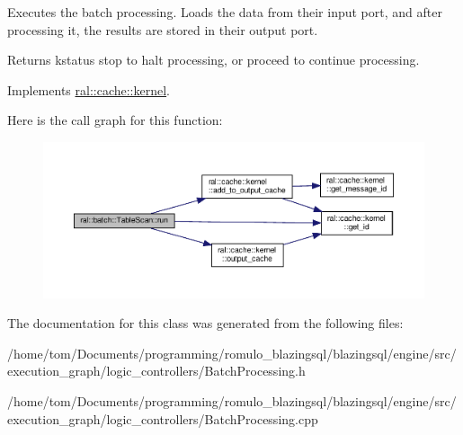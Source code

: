 Executes the batch processing. Loads the data from their input port, and after processing it, the results are stored in their output port. \begin{DoxyReturn}{Returns}
kstatus \textquotesingle{}stop\textquotesingle{} to halt processing, or \textquotesingle{}proceed\textquotesingle{} to continue processing. 
\end{DoxyReturn}


Implements \hyperlink{classral_1_1cache_1_1kernel_a735b081cccae9574924e74ea6d293ef7}{ral\+::cache\+::kernel}.

Here is the call graph for this function\+:\nopagebreak
\begin{figure}[H]
\begin{center}
\leavevmode
\includegraphics[width=350pt]{classral_1_1batch_1_1TableScan_a0dd1b7ffeaec582922ee586b452245c0_cgraph}
\end{center}
\end{figure}


The documentation for this class was generated from the following files\+:\begin{DoxyCompactItemize}
\item 
/home/tom/\+Documents/programming/romulo\+\_\+blazingsql/blazingsql/engine/src/execution\+\_\+graph/logic\+\_\+controllers/Batch\+Processing.\+h\item 
/home/tom/\+Documents/programming/romulo\+\_\+blazingsql/blazingsql/engine/src/execution\+\_\+graph/logic\+\_\+controllers/Batch\+Processing.\+cpp\end{DoxyCompactItemize}
